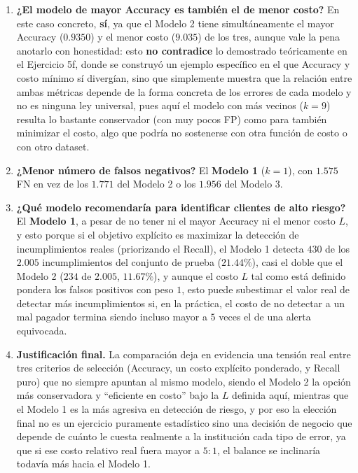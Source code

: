 \begin{enumerate}

\item \textbf{¿El modelo de mayor Accuracy es también el de menor costo?}
En este caso concreto, \textbf{sí}, ya que el Modelo 2 tiene
simultáneamente el mayor Accuracy ($0.9350$) y el menor costo
($9.035$) de los tres, aunque vale la pena anotarlo con honestidad:
esto \textbf{no contradice} lo demostrado teóricamente en el Ejercicio
5f, donde se construyó un ejemplo específico en el que Accuracy y
costo mínimo sí divergían, sino que simplemente muestra que la
relación entre ambas métricas depende de la forma concreta de los
errores de cada modelo y no es ninguna ley universal, pues aquí el
modelo con más vecinos ($k=9$) resulta lo bastante conservador (con
muy pocos FP) como para también minimizar el costo, algo que podría no
sostenerse con otra función de costo o con otro dataset.

\item \textbf{¿Menor número de falsos negativos?}
El \textbf{Modelo 1} ($k=1$), con $1.575$ FN en vez de los $1.771$ del
Modelo 2 o los $1.956$ del Modelo 3.

\item \textbf{¿Qué modelo recomendaría para identificar clientes de alto riesgo?}
El \textbf{Modelo 1}, a pesar de no tener ni el mayor Accuracy ni el
menor costo $L$, y esto porque si el objetivo explícito es maximizar
la detección de incumplimientos reales (priorizando el Recall), el
Modelo 1 detecta $430$ de los $2.005$ incumplimientos del conjunto de
prueba ($21.44\%$), casi el doble que el Modelo 2 ($234$ de $2.005$,
$11.67\%$), y aunque el costo $L$ tal como está definido pondera los
falsos positivos con peso $1$, esto puede subestimar el valor real de
detectar más incumplimientos si, en la práctica, el costo de no
detectar a un mal pagador termina siendo incluso mayor a $5$ veces el
de una alerta equivocada.

\item \textbf{Justificación final.}
La comparación deja en evidencia una tensión real entre tres criterios
de selección (Accuracy, un costo explícito ponderado, y Recall puro)
que no siempre apuntan al mismo modelo, siendo el Modelo 2 la opción
más conservadora y ``eficiente en costo'' bajo la $L$ definida aquí,
mientras que el Modelo 1 es la más agresiva en detección de riesgo, y
por eso la elección final no es un ejercicio puramente estadístico
sino una decisión de negocio que depende de cuánto le cuesta realmente
a la institución cada tipo de error, ya que si ese costo relativo real
fuera mayor a $5{:}1$, el balance se inclinaría todavía más hacia el
Modelo 1.

\end{enumerate}
